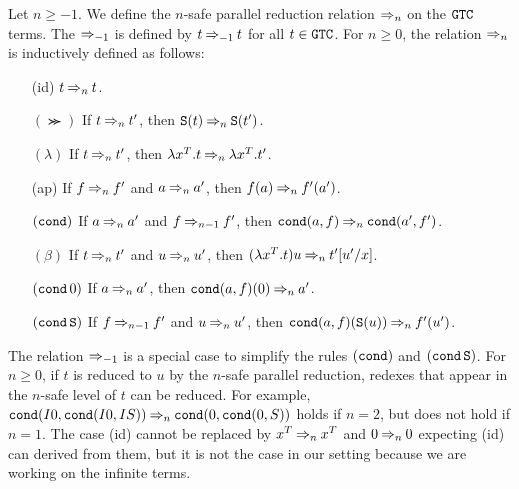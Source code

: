 \begin{definition}
  Let $n\ge -1$.
  We define the $n$-safe parallel reduction relation $\mathbin{\Rightarrow_{n}}$ on the ${\tt GTC}$ terms.
  The $\mathbin{\Rightarrow_{-1}}$ is defined by $t\mathbin{\Rightarrow_{-1}} t$ for all $t\in{\tt GTC}$. 
  For $n\ge 0$, the relation $\mathbin{\Rightarrow_{n}}$ is inductively defined as follows: 
  \begin{itemize}
  \item[(id)]
    $t \mathbin{\Rightarrow_{n}} t$.
  \item[$(\Succ)$]
    If $t \mathbin{\Rightarrow_{n}} t'$, then ${\tt S}(t) \mathbin{\Rightarrow_{n}} {\tt S}(t')$.
  \item[$(\lambda)$]
    If $t \mathbin{\Rightarrow_{n}} t'$, then $\lambda x^T.t \mathbin{\Rightarrow_{n}} \lambda x^T.t'$.
  \item[(ap)]
    If $f \mathbin{\Rightarrow_{n}} f'$ and $a \mathbin{\Rightarrow_{n}} a'$,
    then $f(a) \mathbin{\Rightarrow_{n}} f'(a')$.
  \item[$({\tt cond})$]
    If $a \mathbin{\Rightarrow_{n}} a'$ and $f \mathbin{\Rightarrow_{n-1}} f'$,
    then ${\tt cond}(a,f) \mathbin{\Rightarrow_{n}} {\tt cond}(a',f')$.
  \item[$(\beta)$]
    If $t \mathbin{\Rightarrow_{n}} t'$ and $u \mathbin{\Rightarrow_{n}} u'$,
    then $(\lambda x^T.t)u \mathbin{\Rightarrow_{n}} t'[u'/x]$.
  \item[$({\tt cond}\,0)$]
    If $a \mathbin{\Rightarrow_{n}} a'$, 
    then ${\tt cond}(a,f)(0) \mathbin{\Rightarrow_{n}} a'$.
  \item[$({\tt cond}\,{\tt S})$]
    If $f \mathbin{\Rightarrow_{n-1}} f'$ and $u \mathbin{\Rightarrow_{n}} u'$, 
    then ${\tt cond}(a,f)({\tt S}(u)) \mathbin{\Rightarrow_{n}} f'(u')$.
  \end{itemize}
\end{definition}

The relation $\mathbin{\Rightarrow_{-1}}$ is a special case to simplify
the rules $({\tt cond})$ and $({\tt cond}\,{\tt S})$.
For $n\ge 0$, if $t$ is reduced to $u$ by the $n$-safe parallel reduction,
redexes that appear in the $n$-safe level of $t$ can be reduced. 
For example, ${\tt cond}(I0,{\tt cond}(I0,IS)) \mathbin{\Rightarrow_{n}} {\tt cond}(0,{\tt cond}(0,S))$
holds if $n=2$, but does not hold if $n=1$. 
The case (id) cannot be replaced by $x^T \mathbin{\Rightarrow_{n}} x^T$ and $0 \mathbin{\Rightarrow_{n}} 0$ expecting (id) can derived from them, but it is not the case in our setting
because we are working on the infinite terms. 

